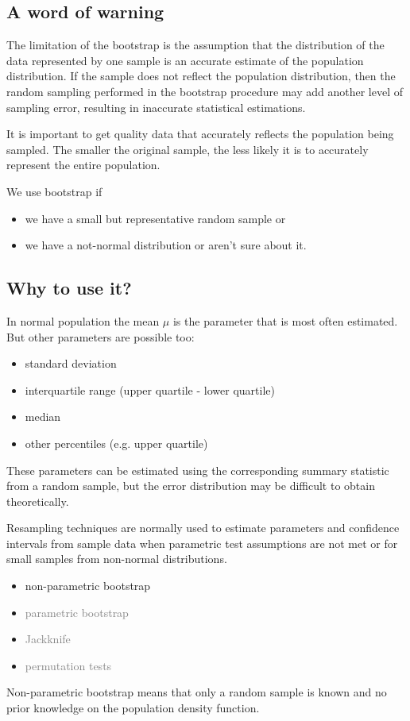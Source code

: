 \subsection{A word of warning}

The limitation of the bootstrap is the assumption that the distribution of the data represented by one sample is an accurate estimate of the population distribution. If the sample does not reflect the population distribution, then the random sampling performed in the bootstrap procedure may add another level of sampling error, resulting in inaccurate statistical estimations.

It is important to get quality data that accurately reflects the population being sampled. The smaller the original sample, the less likely it is to accurately represent the entire population.

We use bootstrap if
\begin{itemize}
	\item we have a small but representative random sample or
	\item we have a not-normal distribution or aren't sure about it.
\end{itemize}

\subsection{Why to use it?}

In normal population the mean $\mu$ is the parameter that is most often estimated. But other parameters are possible too:
\begin{itemize}
	\item standard deviation
	\item interquartile range (upper quartile - lower quartile)
	\item median
	\item other percentiles (e.g. upper quartile)
\end{itemize}
These parameters can be estimated using the corresponding summary statistic from a random sample, but the error distribution may be difficult to obtain theoretically.

Resampling techniques are normally used to estimate parameters and confidence intervals from sample data when parametric test assumptions are not met or for small samples from non-normal distributions.
\begin{itemize}
	\item non-parametric bootstrap
	\item \textcolor{gray}{parametric bootstrap}
	\item \textcolor{gray}{Jackknife}
	\item \textcolor{gray}{permutation tests}
\end{itemize}
Non-parametric bootstrap means that only a random sample is known and no prior knowledge on the population density function.

